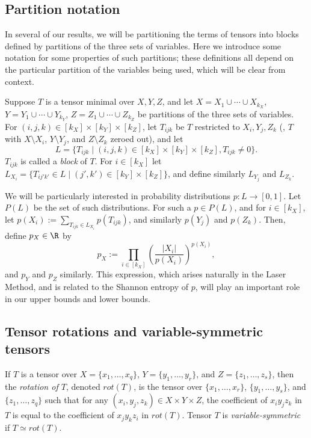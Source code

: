 \documentclass{toc}
\begin{document}
%
\subsection{Partition notation} \label{partitionnotation}

In 
%
%
several  %
of our results, we will be partitioning the terms of tensors into blocks defined by partitions of the three
%
sets of variables.   %
Here we introduce some notation for some properties of such partitions; these definitions all depend on the particular partition of the variables being used, which will be clear from context.

Suppose $T$ is a tensor minimal over $X,Y,Z$, and let $X = X_1 \cup \cdots \cup X_{k_X}$, $Y = Y_1 \cup \cdots \cup Y_{k_Y}$, $Z = Z_1 \cup \cdots \cup Z_{k_Z}$ be partitions of the three 
%
sets of variables. For $(i,j,k) \in [k_X]\times[k_Y]\times[k_Z]$, let $T_{ijk}$ be $T$ restricted to $X_i, Y_j, Z_k$ (\ie, $T$ with $X \setminus X_i$, $Y \setminus Y_j$, and $Z \setminus Z_k$ zeroed out), and let
\[
  L = \{ T_{ijk} \mid (i,j,k) \in [k_X]\times[k_Y]\times[k_Z], T_{ijk} \neq 0\}.
\]
$T_{ijk}$ is called a \emph{block} of $T$. For $i \in [k_X]$ let $L_{X_i} = \{ T_{ij'k'} \in L \mid (j',k') \in  [k_Y] \times [k_Z]\}$, and define similarly $L_{Y_j}$ and $L_{Z_k}$.

We will be particularly interested in probability distributions $p : L \to [0,1]$. Let $P(L)$ be the set of such distributions. For such a $p \in P(L)$, and for $i \in [k_X]$, let $p(X_i) := \sum_{T_{ijk} \in L_{X_i}} p(T_{ijk})$, and similarly $p(Y_j)$ and $p(Z_k)$. Then, define $p_X \in \R$ by
$$p_X := \prod_{i \in [k_X]} \left( \frac{|X_i|}{p(X_i)}\right)^{p(X_i)},$$
and $p_Y$ and $p_Z$ similarly. This expression, which arises naturally in the Laser Method, and is related to the Shannon entropy of $p$, will play an important role in our upper bounds and lower bounds.

%
\subsection{Tensor rotations and variable-symmetric tensors} \label{symmetricnotation}

If $T$ is a tensor over $X = \{x_1, \ldots, x_q\}$, $Y = \{y_1, \ldots, y_r\}$, and $Z = \{z_1, \ldots, z_s \}$, then the \emph{rotation of $T$}, denoted $rot(T)$, is the tensor over $\{x_1, \ldots, x_r\}$, $\{y_1, \ldots, y_s\}$, and $\{z_1, \ldots, z_q \}$ such that for any $(x_i, y_j, z_k) \in X \times Y \times Z$, the coefficient of $x_i y_j z_k$ in $T$ is equal to the coefficient of $x_j y_k z_i$ in $rot(T)$. Tensor $T$ is \emph{variable-symmetric} if $T \simeq rot(T)$.
\end{document}
